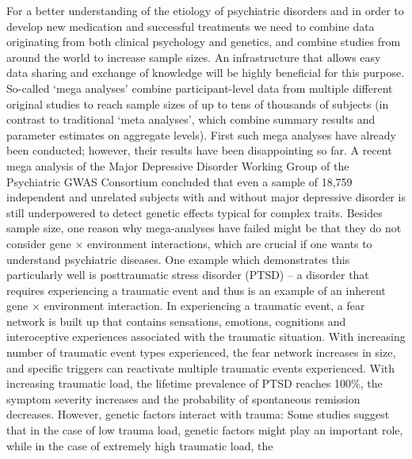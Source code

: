 \documentclass[a4paper,USenglish]{dagrep}
\begin{document}
{}
\license
For a better understanding of the etiology of psychiatric disorders and in order
to develop new medication and successful treatments we need to combine data
originating from both clinical psychology and genetics, and combine studies from
around the world to increase sample sizes. An infrastructure that allows easy
data sharing and exchange of knowledge will be highly beneficial for this purpose. 
So-called `mega analyses' combine participant-level data from multiple different
original studies to reach sample sizes of up to tens of thousands of subjects
(in contrast to traditional `meta analyses', which combine summary results and
parameter estimates on aggregate levels). First such mega analyses have already
been conducted; however, their results have been disappointing so far. A recent
mega analysis of the Major Depressive Disorder Working Group of the Psychiatric
GWAS Consortium concluded that even a sample of 18,759 independent and unrelated
subjects with and without major depressive disorder is still underpowered to
detect genetic effects typical for complex traits. 
Besides sample size, one reason why mega-analyses have failed might be that they
do not consider gene × environment interactions, which are crucial if one wants
to understand psychiatric diseases. One example which demonstrates this
particularly well is posttraumatic stress disorder (PTSD) – a disorder that
requires experiencing a traumatic event and thus is an example of an inherent
gene × environment interaction. In experiencing a traumatic event, a fear
network is built up that contains sensations, emotions, cognitions and
interoceptive experiences associated with the traumatic situation. With
increasing number of traumatic event types experienced, the fear network
increases in size, and specific triggers can reactivate multiple traumatic
events experienced. With increasing traumatic load, the lifetime prevalence of
PTSD reaches 100\%, the symptom severity increases and the probability of
spontaneous remission decreases. However, genetic factors interact with trauma:
Some studies suggest that in the case of low trauma load, genetic factors might
play an important role, while in the case of extremely high traumatic load, the
\end{document}
